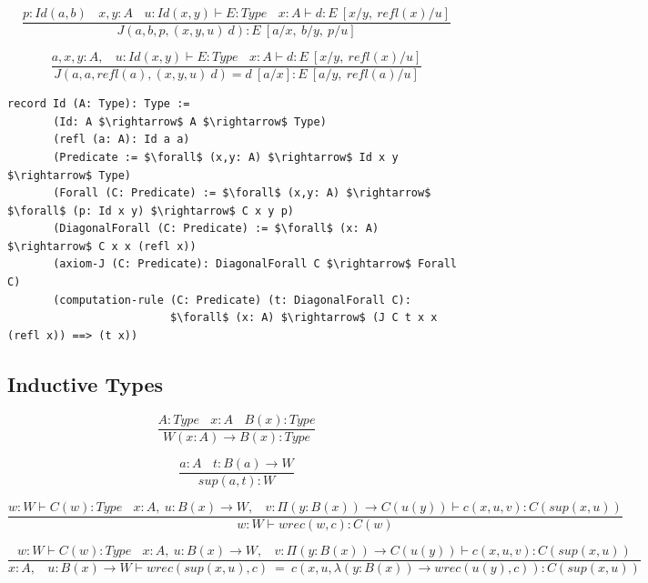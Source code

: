 \documentclass[11pt,oneside]{article}
\begin{document}
\begin{equation}
\tag{$J$-elimination}
\dfrac
  {p:Id(a,b)\ \ \ \ x,y:A\ \ \ \ u:Id(x,y) \vdash E:Type\ \ \ \ x:A \vdash d: E\ [x/y,\ refl(x)/u]}
  {J(a,b,p,(x,y,u)\ d) : E\ [a/x,\ b/y,\ p/u]}
\end{equation}

\begin{equation}
\tag{$Id$-computation}
\dfrac
  {a,x,y:A,\ \ \ \ u:Id(x,y) \vdash E:Type\ \ \ \ x:A \vdash d:E\ [x/y,\ refl(x)/u]}
  {J(a,a,refl(a),(x,y,u)\ d) = d\ [a/x] : E\ [a/y,\ refl(a)/u]}
\end{equation}

\begin{lstlisting}[mathescape=true]
record Id (A: Type): Type :=
       (Id: A $\rightarrow$ A $\rightarrow$ Type)
       (refl (a: A): Id a a)
       (Predicate := $\forall$ (x,y: A) $\rightarrow$ Id x y $\rightarrow$ Type)
       (Forall (C: Predicate) := $\forall$ (x,y: A) $\rightarrow$ $\forall$ (p: Id x y) $\rightarrow$ C x y p)
       (DiagonalForall (C: Predicate) := $\forall$ (x: A) $\rightarrow$ C x x (refl x))
       (axiom-J (C: Predicate): DiagonalForall C $\rightarrow$ Forall C)
       (computation-rule (C: Predicate) (t: DiagonalForall C):
                         $\forall$ (x: A) $\rightarrow$ (J C t x x (refl x)) ==> (t x))
\end{lstlisting}

\subsection{Inductive Types}

\begin{equation}
\tag{$W$-formation}
\dfrac
  {A:Type\ \ \ \ x:A\ \ \ \ B(x):Type}
  {W (x:A) \rightarrow B(x) : Type}
\end{equation}

\begin{equation}
\tag{$W$-intro}
\dfrac
  {a:A\ \ \ \ t: B(a) \rightarrow W}
  {sup(a,t) : W}
\end{equation}

\begin{equation}
\tag{$W$-elimination}
\dfrac
  {w: W \vdash C(w) : Type\ \ \ \ x:A,\ u:B(x) \rightarrow W,\ \ \ \ v:\Pi (y:B(x)) \rightarrow C(u(y)) \vdash c(x,u,v):C(sup(x,u))}
  {w:W \vdash wrec(w,c):C(w)}
\end{equation}

\begin{equation}
\tag{$W$-computation}
\dfrac
  {w: W \vdash C(w) : Type\ \ \ \ x:A,\ u:B(x) \rightarrow W,\ \ \ \ v:\Pi (y:B(x)) \rightarrow C(u(y)) \vdash c(x,u,v):C(sup(x,u))}
  {x:A,\ \ \ \ u:B(x) \rightarrow W \vdash wrec(sup(x,u),c)\ =\ c(x,u,\lambda (y:B(x)) \rightarrow wrec(u(y),c)):C(sup(x,u))}
\end{equation}
\end{document}
